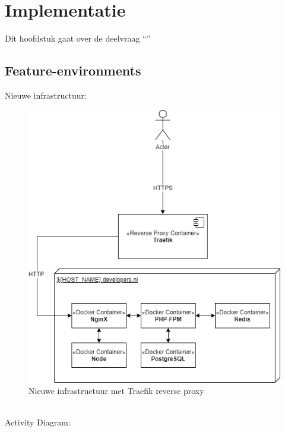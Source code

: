 \chapter{Implementatie}

\label{Chapter6}

Dit hoofdstuk gaat over de deelvraag \enquote{\deelimplementatie}

\section{Feature-environments}
Nieuwe infrastructuur:
\begin{figure}[h]
	\centering
	\includegraphics[width=13cm]{Figures/Traefik}
	\decoRule
	\caption[TraefikInfrastructure]{Nieuwe infrastructuur met Traefik reverse proxy}
	\label{fig:infra}
\end{figure}
\\Activity Diagram:
